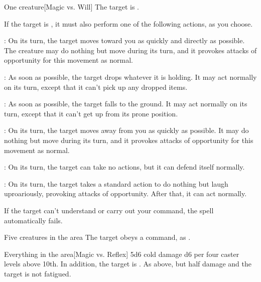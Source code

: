 \spellrng{\rngmed}
\begin{spelltarget}{One creature}[Magic vs. Will]
    \spellsuccess The target is \bewildered.

    If the target is \bloodied, it must also perform one of the following actions, as you choose.
    \par {}: On its turn, the target moves toward you as quickly and directly as possible. The creature may do nothing but move during its turn, and it provokes attacks of opportunity for this movement as normal.
    \par {}: As soon as possible, the target drops whatever it is holding. It may act normally on its turn, except that it can't pick up any dropped items.
    \par {}: As soon as possible, the target falls to the ground. It may act normally on its turn, except that it can't get up from its prone position.
    \par {}: On its turn, the target moves away from you as quickly as possible. It may do nothing but move during its turn, and it provokes attacks of opportunity for this movement as normal.
    \par {}: On its turn, the target can take no actions, but it can defend itself normally.
    \par {}: On its turn, the target takes a standard action to do nothing but laugh uproariously, provoking attacks of opportunity. After that, it can act normally.
\end{spelltarget}
\spellnotes If the target can't understand or carry out your command, the spell automatically fails.

\spellrng{\rngmed}
\begin{spelltarget}{Five creatures in the area}
    \spellsuccess The target obeys a command, as .
\end{spelltarget}

\spelldur{\durshort}
\begin{spelltarget}{Everything in the area}[Magic vs. Reflex]
    \spellsuccess 5d6 cold damage \add d6 per four caster levels above 10th. In addition, the target is \fatigued.
    \spellfailure As above, but half damage and the target is not fatigued.
\end{spelltarget}
\spellnotes \destructivespellnotes

